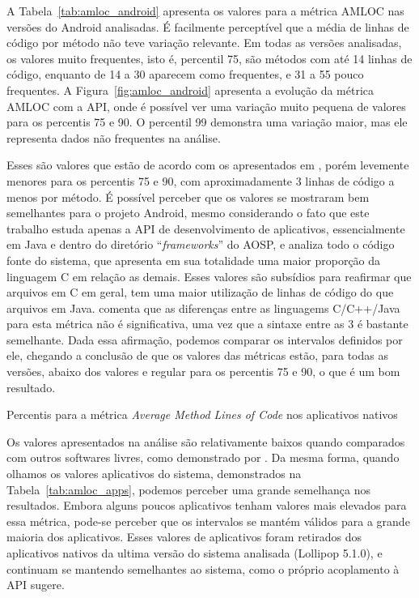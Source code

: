 A Tabela~\ref{tab:amloc_android} apresenta os valores para a métrica AMLOC nas versões do Android analisadas. É facilmente perceptível que a média de linhas de código por método não teve variação relevante. Em todas as versões analisadas, os valores muito frequentes, isto é, percentil 75, são métodos com até 14 linhas de código, enquanto de 14 a 30 aparecem como frequentes, e 31 a 55 pouco frequentes. A Figura~\ref{fig:amloc_android} apresenta a evolução da métrica AMLOC com a API, onde é possível ver uma variação muito pequena de valores para os percentis 75 e 90. O percentil 99 demonstra uma variação maior, mas ele representa dados não frequentes na análise.

Esses são valores que estão de acordo com os apresentados em , porém levemente menores para os percentis 75 e 90, com aproximadamente 3 linhas de código a menos por método. É possível perceber que os valores se mostraram bem semelhantes para o projeto Android, mesmo considerando o fato que este trabalho estuda apenas a API de desenvolvimento de aplicativos, essencialmente em Java e dentro do diretório ``\textit{frameworks}'' do AOSP, e  analiza todo o código fonte do sistema, que apresenta em sua totalidade uma maior proporção da linguagem C em relação as demais. Esses valores são subsídios para reafirmar que arquivos em C em geral, tem uma maior utilização de linhas de código do que arquivos em Java.  comenta que as diferenças entre as linguagems C/C++/Java para esta métrica não é significativa, uma vez que a sintaxe entre as 3 é bastante semelhante. Dada essa afirmação, podemos comparar os intervalos definidos por ele, chegando a conclusão de que os valores das métricas estão, para todas as versões, abaixo dos valores e regular para os percentis 75 e 90, o que é um bom resultado.

\begin{table}[!htb]

\caption{Percentis para a métrica \textit{Average Method Lines of Code} nos aplicativos nativos}
\label{tab:amloc_apps}
\end{table}

Os valores apresentados na análise são relativamente baixos quando comparados com outros softwares livres, como demonstrado por . Da mesma forma, quando olhamos os valores aplicativos do sistema, demonstrados na Tabela~\ref{tab:amloc_apps}, podemos perceber uma grande semelhança nos resultados. Embora alguns poucos aplicativos tenham valores mais elevados para essa métrica, pode-se perceber que os intervalos se mantém válidos para a grande maioria dos aplicativos. Esses valores de aplicativos foram retirados dos aplicativos nativos da ultima versão do sistema analisada (Lollipop 5.1.0), e continuam se mantendo semelhantes ao sistema, como o próprio acoplamento à API sugere.

